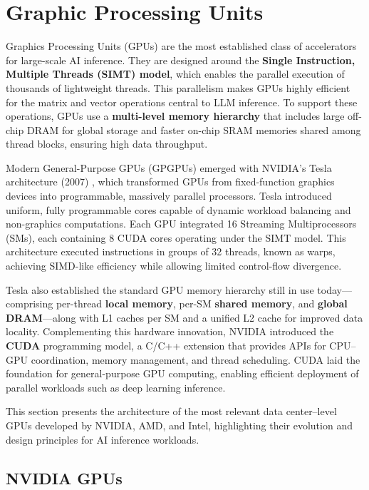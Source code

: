 \section{Graphic Processing Units}
\label{chap:background:sec:gpu}

Graphics Processing Units (GPUs) are the most established class of accelerators for large-scale AI inference. They are designed around the \textbf{Single Instruction, Multiple Threads (SIMT) model}, which enables the parallel execution of thousands of lightweight threads. This parallelism makes GPUs highly efficient for the matrix and vector operations central to LLM inference. To support these operations, GPUs use a \textbf{multi-level memory hierarchy} that includes large off-chip DRAM for global storage and faster on-chip SRAM memories shared among thread blocks, ensuring high data throughput.

Modern General-Purpose GPUs (GPGPUs) emerged with NVIDIA’s Tesla architecture (2007) \cite{lindholm2008nvidia}, which transformed GPUs from fixed-function graphics devices into programmable, massively parallel processors. Tesla introduced uniform, fully programmable cores capable of dynamic workload balancing and non-graphics computations. Each GPU integrated 16 Streaming Multiprocessors (SMs), each containing 8 CUDA cores operating under the SIMT model. This architecture executed instructions in groups of 32 threads, known as warps, achieving SIMD-like efficiency while allowing limited control-flow divergence.

Tesla also established the standard GPU memory hierarchy still in use today—comprising per-thread \textbf{local memory}, per-SM \textbf{shared memory}, and \textbf{global DRAM}—along with L1 caches per SM and a unified L2 cache for improved data locality. Complementing this hardware innovation, NVIDIA introduced the \textbf{CUDA} programming model, a C/C++ extension that provides APIs for CPU–GPU coordination, memory management, and thread scheduling. CUDA laid the foundation for general-purpose GPU computing, enabling efficient deployment of parallel workloads such as deep learning inference.

This section presents the architecture of the most relevant data center–level GPUs developed by NVIDIA, AMD, and Intel, highlighting their evolution and design principles for AI inference workloads.

\subsection{NVIDIA GPUs}

